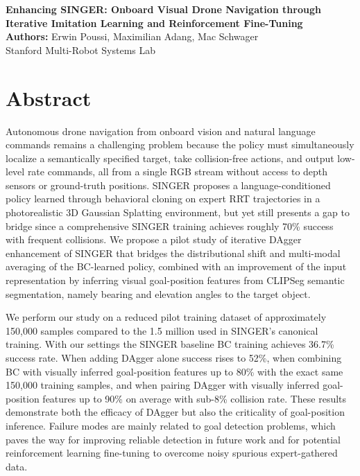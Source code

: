 \documentclass{article}
\renewcommand{\maketitle}{
  \begin{center}
    {\bf \large Enhancing SINGER: Onboard Visual Drone Navigation through Iterative Imitation Learning and Reinforcement Fine-Tuning}\\
    \vspace{0.2cm}
    {\bf Authors:} Erwin Poussi, Maximilian Adang, Mac Schwager\\
    \vspace{0.1cm}
    Stanford Multi-Robot Systems Lab\\
    \vspace{0.3cm}
  \end{center}
}
\begin{document}
\maketitle

\section*{Abstract}

Autonomous drone navigation from onboard vision and natural language commands remains a challenging problem because the policy must simultaneously localize a semantically specified target, take collision-free actions, and output low-level rate commands, all from a single RGB stream without access to depth sensors or ground-truth positions. SINGER proposes a language-conditioned policy learned through behavioral cloning on expert RRT trajectories in a photorealistic 3D Gaussian Splatting environment, but yet still presents a gap to bridge since a comprehensive SINGER training achieves roughly 70\% success with frequent collisions. We propose a pilot study of iterative DAgger enhancement of SINGER that bridges the distributional shift and multi-modal averaging of the BC-learned policy, combined with an improvement of the input representation by inferring visual goal-position features from CLIPSeg semantic segmentation, namely bearing and elevation angles to the target object.

We perform our study on a reduced pilot training dataset of approximately 150,000 samples compared to the 1.5 million used in SINGER's canonical training. With our settings the SINGER baseline BC training achieves 36.7\% success rate. When adding DAgger alone success rises to 52\%, when combining BC with visually inferred goal-position features up to 80\% with the exact same 150,000 training samples, and when pairing DAgger with visually inferred goal-position features up to 90\% on average with sub-8\% collision rate. These results demonstrate both the efficacy of DAgger but also the criticality of goal-position inference. Failure modes are mainly related to goal detection problems, which paves the way for improving reliable detection in future work and for potential reinforcement learning fine-tuning to overcome noisy spurious expert-gathered data.
\end{document}
